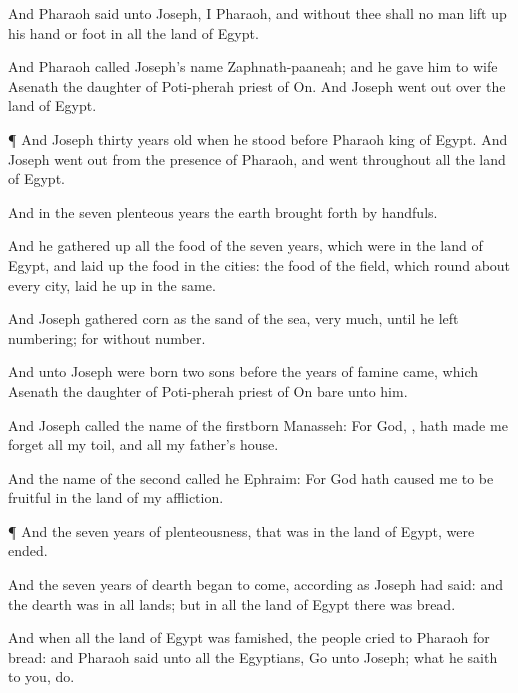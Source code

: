 {And
Pharaoh
said unto
Joseph, I
{}
Pharaoh, and
without thee shall no
man lift
up his
hand or
foot in all the
land of
Egypt.

And
Pharaoh
called
Joseph’s
name
Zaphnath-paaneah; and he
gave him to
wife
Asenath the
daughter of
Poti-pherah
priest of
On. And
Joseph went
out over
{} the
land of
Egypt.


\par }{\PP {}¶ And
Joseph
{}
thirty
years
old when he
stood
before
Pharaoh
king of
Egypt. And
Joseph went
out from the
presence of
Pharaoh, and went
throughout all the
land of
Egypt.

And in the
seven
plenteous
years the
earth brought
forth by
handfuls.

And he gathered
up all the
food of the
seven
years, which were in the
land of
Egypt, and laid
up the
food in the
cities: the
food of the
field, which
{} round
about every
city, laid he
up in the
same.

And
Joseph
gathered
corn as the
sand of the
sea,
very
much, until he
left
numbering; for
{}
without
number.

And unto
Joseph were
born
two
sons before the
years of
famine
came, which
Asenath the
daughter of
Poti-pherah
priest of
On
bare unto him.

And
Joseph
called the
name of the
firstborn
Manasseh: For
God,
{}, hath made me
forget all my
toil, and all my
father’s
house.

And the
name of the
second
called he
Ephraim: For
God hath caused me to be
fruitful in the
land of my
affliction.


\par }{\PP {}¶ And the
seven
years of
plenteousness, that was in the
land of
Egypt, were
ended.

And the
seven
years of
dearth
began to
come, according as
Joseph had
said: and the
dearth was in all
lands; but in all the
land of
Egypt there was
bread.

And when all the
land of
Egypt was
famished, the
people
cried to
Pharaoh for
bread: and
Pharaoh
said unto all the
Egyptians,
Go unto
Joseph; what he
saith to you,
do.

}
